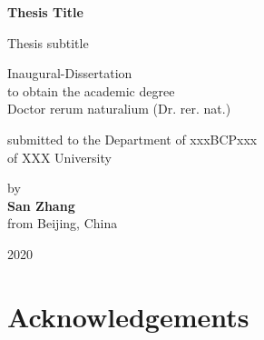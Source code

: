 \documentclass[12pt,openright]{book}
\begin{document}

\begin{titlepage}
\begin{center}
  \vspace*{1cm}

  \Huge \textbf{Thesis Title}

  \vspace{0.5cm}

  \Large{Thesis subtitle}

  \vspace{2cm}

  \large{Inaugural-Dissertation \\ to obtain the academic degree \\ Doctor rerum naturalium (Dr. rer. nat.)}

  \vspace{1.5cm}

  \large{submitted to the Department of xxxBCPxxx \\ of XXX University}

  \vspace{1.5cm}


  \vfill

  \large{by \\ \textbf{San Zhang} \\ from Beijing, China}
  
  \vspace{0.5cm}

  \large{2020}
  

\end{center}
\end{titlepage}

\pagestyle{empty}
\tableofcontents
\clearpage

\pagestyle{fancy-stylename}

\frontmatter

\chapter*{Acknowledgements}
\lipsum[1-5]
\end{document}
